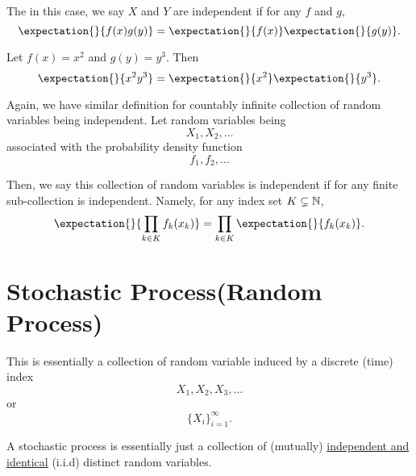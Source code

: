The in this case, we say \(X\) and \(Y\) are independent if for any \(f\) and \(g\),
\[
	\expectation{}{f(x)g(y)} = \expectation{}{f(x)}\expectation{}{g(y)}.
\]
\begin{eg}
	Let \(f(x) = x^2\) and \(g(y) = y^3\). Then
	\[
		\expectation{}{x^2 y^3} = \expectation{}{x^2} \expectation{}{y^3}.
	\]
\end{eg}

Again, we have similar definition for countably infinite collection of random variables being independent. Let random variables being
\[
	X_1, X_2, \ldots
\]
associated with the probability density function
\[
	f_1, f_2, \ldots
\]

Then, we say this collection of random variables is independent if for any finite sub-collection is independent. Namely, for any index set \(K\subsetneq\mathbb{\MakeUppercase{N}}\),
\[
	\expectation{}{\prod\limits_{k\in K} f_k(x_k)} = \prod\limits_{k\in K} \expectation{}{f_k(x_k)}.
\]


\section{Stochastic Process(Random Process)}
This is essentially a collection of random variable induced by a discrete (time) index
\[
	X_1, X_2, X_3, \ldots
\]
or
\[
	\{X_i\}_{i = 1}^{\infty }.
\]

\begin{intuition}
	A stochastic process is essentially just a collection of (mutually) \underline{independent and identical} (i.i.d) distinct random variables.
\end{intuition}

